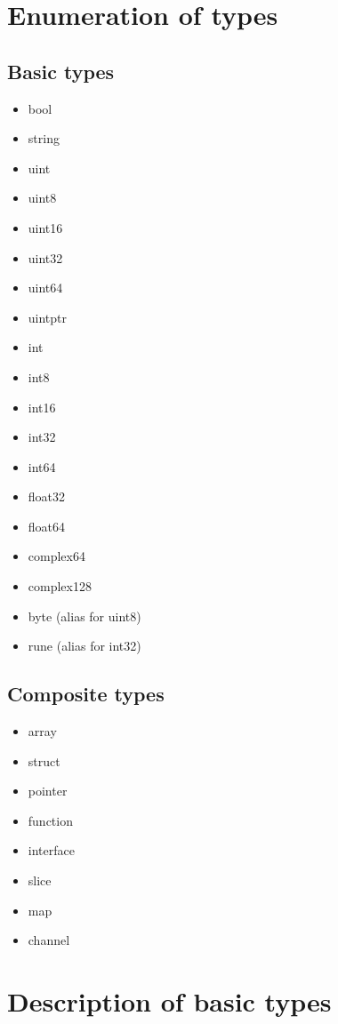 \documentclass{article}
\begin{document}
\tableofcontents
\newpage

\section{Enumeration of types}
	\subsection{Basic types}
		\begin{itemize}
			\item bool
			\item string
			\item uint
			\item uint8
			\item uint16
			\item uint32
			\item uint64
			\item uintptr
			\item int
			\item int8
			\item int16
			\item int32
			\item int64
			\item float32
			\item float64
			\item complex64
			\item complex128
			\item byte (alias for uint8)
			\item rune (alias for int32)
		\end{itemize}
	\subsection{Composite types}
		\begin{itemize}
			\item array
			\item struct
			\item pointer
			\item function
			\item interface
			\item slice
			\item map
			\item channel
		\end{itemize}

\section{Description of basic types}
\end{document}

